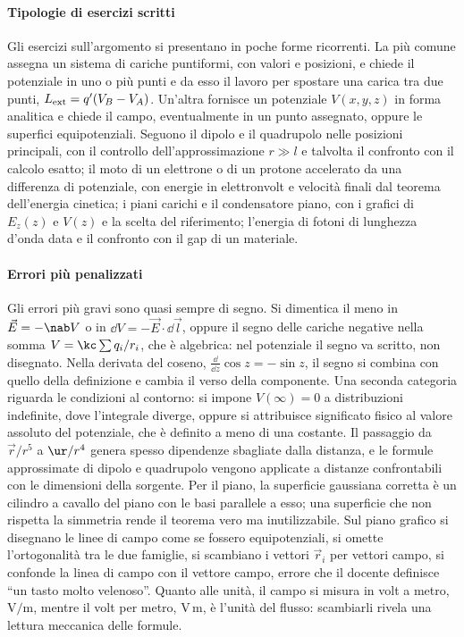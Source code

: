 \documentclass[main.tex]{subfiles}
\begin{document}
	\paragraph*{Tipologie di esercizi scritti}
	Gli esercizi sull'argomento si presentano in poche forme ricorrenti. La più comune assegna un sistema di cariche puntiformi, con valori e posizioni, e chiede il potenziale in uno o più punti e da esso il lavoro per spostare una carica tra due punti, $L_{\rm ext}=q'(V_B-V_A)$. Un'altra fornisce un potenziale $V(x,y,z)$ in forma analitica e chiede il campo, eventualmente in un punto assegnato, oppure le superfici equipotenziali. Seguono il dipolo e il quadrupolo nelle posizioni principali, con il controllo dell'approssimazione $r\gg l$ e talvolta il confronto con il calcolo esatto; il moto di un elettrone o di un protone accelerato da una differenza di potenziale, con energie in elettronvolt e velocità finali dal teorema dell'energia cinetica; i piani carichi e il condensatore piano, con i grafici di $E_z(z)$ e $V(z)$ e la scelta del riferimento; l'energia di fotoni di lunghezza d'onda data e il confronto con il gap di un materiale.
	
	\paragraph*{Errori più penalizzati}
	Gli errori più gravi sono quasi sempre di segno. Si dimentica il meno in $\vec E=-\nab V$ o in $\dd V=-\vec E\cdot\dd\vec l$, oppure il segno delle cariche negative nella somma $V=\kc\sum q_i/r_i$, che è algebrica: nel potenziale il segno va scritto, non disegnato. Nella derivata del coseno, $\frac{\dd}{\dd z}\cos z=-\sin z$, il segno si combina con quello della definizione e cambia il verso della componente. Una seconda categoria riguarda le condizioni al contorno: si impone $V(\infty)=0$ a distribuzioni indefinite, dove l'integrale diverge, oppure si attribuisce significato fisico al valore assoluto del potenziale, che è definito a meno di una costante. Il passaggio da $\vec r/r^5$ a $\ur/r^4$ genera spesso dipendenze sbagliate dalla distanza, e le formule approssimate di dipolo e quadrupolo vengono applicate a distanze confrontabili con le dimensioni della sorgente. Per il piano, la superficie gaussiana corretta è un cilindro a cavallo del piano con le basi parallele a esso; una superficie che non rispetta la simmetria rende il teorema vero ma inutilizzabile. Sul piano grafico si disegnano le linee di campo come se fossero equipotenziali, si omette l'ortogonalità tra le due famiglie, si scambiano i vettori $\vec r_i$ per vettori campo, si confonde la linea di campo con il vettore campo, errore che il docente definisce \enquote{un tasto molto velenoso}. Quanto alle unità, il campo si misura in volt a metro, $\mathrm{V/m}$, mentre il volt per metro, $\mathrm{V\,m}$, è l'unità del flusso: scambiarli rivela una lettura meccanica delle formule.
	
\end{document}
